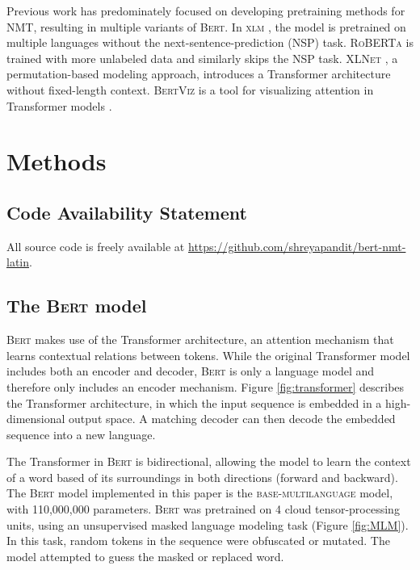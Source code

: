 \documentclass[11pt,a4paper]{article}
\begin{document}
Previous work has predominately focused on developing pretraining methods for NMT,
resulting in multiple variants of \textsc{Bert}.
In \textsc{xlm} \citep{lample2019crosslingual},
the model is pretrained on multiple languages without the next-sentence-prediction (NSP) task.
\textsc{RoBERTa} \citep{liu2019roberta} is trained with more unlabeled data and similarly skips the NSP task.
\textsc{XLNet} \citep{yang2019making, dai2019transformerxl}, a permutation-based modeling approach,
introduces a Transformer architecture without fixed-length context.
\textsc{BertViz} is a tool for visualizing attention in Transformer models
\cite{vig2019transformervis}.

\section{Methods}

\subsection{Code Availability Statement}

All source code is freely available at
\href{https://github.com/shreyapandit/bert-nmt-latin}{https://github.com/shreyapandit/bert-nmt-latin}.

\subsection{The \textsc{Bert} model}

\textsc{Bert} makes use of the Transformer architecture,
an attention mechanism that learns contextual relations between tokens.
While the original Transformer model \cite{vaswani2017attention}
includes both an encoder and decoder,
\textsc{Bert} is only a language model
and therefore only includes an encoder mechanism.
Figure \ref{fig:transformer} describes the Transformer architecture,
in which the input sequence is embedded in a high-dimensional output space.
A matching decoder can then decode the embedded sequence into a new language.

The Transformer in \textsc{Bert} is bidirectional,
allowing the model to learn the context of a word based
of its surroundings in both directions (forward and backward).
The \textsc{Bert} model implemented in this paper
is the \textsc{base-multilanguage} model, with 110,000,000 parameters.
\textsc{Bert} was pretrained on 4 cloud tensor-processing units,
using an unsupervised masked language modeling task (Figure \ref{fig:MLM}).
In this task, random tokens in the sequence were obfuscated or mutated.
The model attempted to guess the masked or replaced word.
\end{document}
